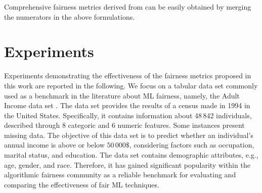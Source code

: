 \documentclass[letterpaper]{article} %
\begin{document}
\noindent Comprehensive fairness metrics derived from  can be easily obtained by merging the numerators in the above formulations.

\section{Experiments}

Experiments demonstrating the effectiveness of the fairness metrics proposed in this work are reported in the following.
%
We focus on a tabular data set commonly used as a benchmark in the literature about ML fairness, namely, the Adult Income data set \cite{Dua_2019}.
%
The data set provides the results of a census made in 1994 in the United States. Specifically, it contains information about 48\,842 individuals, described through 8 categoric and 6 numeric features. Some instances present missing data.
%
The objective of this data set is to predict whether an individual's annual income is above or below $50\,000\$$, considering factors such as occupation, marital status, and education. The data set contains demographic attributes, e.g., age, gender, and race.
%
Therefore, it has gained significant popularity within the algorithmic fairness community as a reliable benchmark for evaluating and comparing the effectiveness of fair ML techniques.
%
\end{document}
